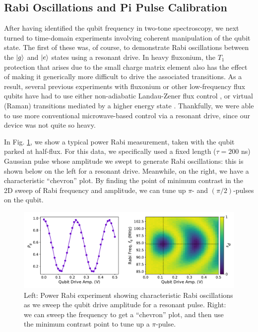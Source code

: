 \subsection{Rabi Oscillations and Pi Pulse Calibration}

After having identified the qubit frequency in two-tone spectroscopy, we next turned to time-domain experiments involving coherent manipulation of the qubit state. The first of these was, of course, to demonstrate Rabi oscillations between the $\lvert g\rangle$ and $\lvert e\rangle$ states using a resonant drive. In heavy fluxonium, the $T_1$ protection that arises due to the small charge matrix element also has the effect of making it generically more difficult to drive the associated transitions. As a result, several previous experiments with fluxonium or other low-frequency flux qubits have had to use either non-adiabatic Landau-Zener flux control \cite{oliver2005mach, campbell2020universal, zhang2021universal}, or virtual (Raman) transitions mediated by a higher energy state \cite{earnest2018realization}. Thankfully, we were able to use more conventional microwave-based control via a resonant drive, since our device was not quite so heavy. 

In Fig. \ref{fig:4_rabi}, we show a typical power Rabi measurement, taken with the qubit parked at half-flux. For this data, we specifically used a fixed length ($\tau = 200$ ns) Gaussian pulse whose amplitude we swept to generate Rabi oscillations: this is shown below on the left for a resonant drive. Meanwhile, on the right, we have a characteristic ``chevron'' plot. By finding the point of minimum contrast in the 2D sweep of Rabi frequency and amplitude, we can tune up $\pi$- and $(\pi/2)$-pulses on the qubit. 

\begin{figure}[h]
    \centering
    \includegraphics[width=0.95\linewidth]{Figures/4/rabi.pdf}
    \caption{Left: Power Rabi experiment showing characteristic Rabi oscillations as we sweep the qubit drive amplitude for a resonant pulse. Right: we can sweep the frequency to get a ``chevron'' plot, and then use the minimum contrast point to tune up a $\pi$-pulse.}
    \label{fig:4_rabi}
\end{figure}

